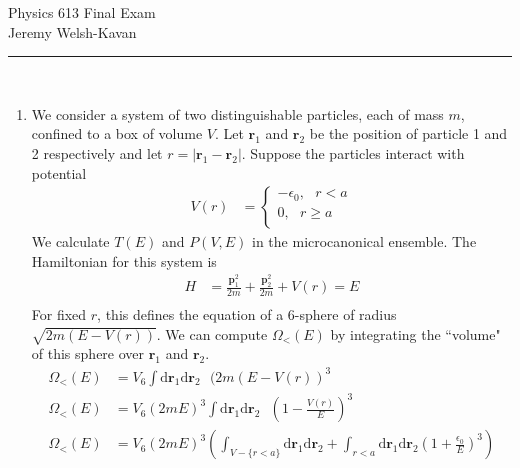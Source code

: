 \documentclass[]{book}
\begin{document}
{\Large Physics 613 Final Exam}\\
{Jeremy Welsh-Kavan}\\
\vspace{0.2 cm}
\begin{center}
\noindent\rule{15cm}{0.4pt} \\
\end{center}
\begin{enumerate}[1)]
\item We consider a system of two distinguishable particles, each of mass $m$, confined to a box of volume $V$. Let $\textbf{r}_1$ and $\textbf{r}_2$ be the position of particle 1 and 2 respectively and let $r = |\textbf{r}_1- \textbf{r}_2|$. Suppose the particles interact with potential
\begin{equation}
\begin{split}
V(r) & = \begin{cases}
-\epsilon_0 , \text{ } r< a \\
0 ,  \text{ } r \ge a \\
\end{cases}
\end{split}
\end{equation}
We calculate $T(E)$ and $P(V,E)$ in the microcanonical ensemble. The Hamiltonian for this system is 
\begin{equation}
\begin{split}
H & = \frac{\textbf{p}_1^2}{2m} + \frac{\textbf{p}_2^2}{2m} + V(r) = E \\
\end{split}
\end{equation}
For fixed $r$, this defines the equation of a 6-sphere of radius $\sqrt{2m(E-V(r))}$. We can compute $\Omega_<(E)$ by integrating the ``volume" of this sphere over $\textbf{r}_1$ and $\textbf{r}_2$.
\begin{equation}
\begin{split}
\Omega_<(E) & = V_6 \int \text{d}\textbf{r}_1\text{d}\textbf{r}_2 \text{ }(2m(E-V(r))^3 \\
\Omega_<(E) & = V_6(2mE)^3 \int \text{d}\textbf{r}_1\text{d}\textbf{r}_2 \text{ }\left(1-\frac{V(r)}{E}\right)^3 \\
\Omega_<(E) & = V_6(2mE)^3 \left (\int_{V-\{r<a\}}  \text{d}\textbf{r}_1\text{d}\textbf{r}_2  + \int_{r<a } \text{d}\textbf{r}_1\text{d}\textbf{r}_2 \left(1+\frac{\epsilon_0}{E}\right)^3\right) \\

\end{split}
\end{equation}
\end{enumerate}
\end{document}
